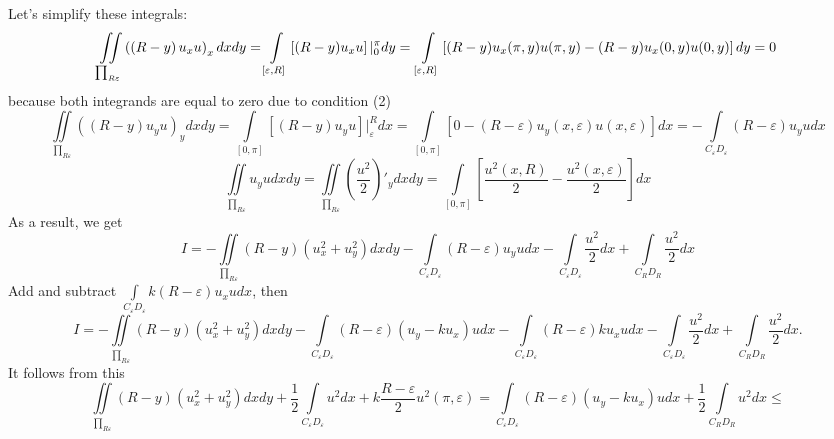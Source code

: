\documentclass[11pt,twoside]{article}
\begin{document}
	Let's simplify these integrals:
	\begin{equation*}
		\iint\limits_{\prod_{R\varepsilon}} \left( \left(R - y\right) u_x u\right)_x dx dy = \int\limits_{[\varepsilon, R]} \left[(R-y)u_xu\right] \vert_0^\pi dy = \\ \int\limits_{[\varepsilon, R]} \left[(R-y) u_x(\pi, y)u(\pi,y) - (R-y) u_x(0, y)u(0,y)\right]dy = 0
	\end{equation*} because both integrands are equal to zero due to condition (2)
	\begin{equation*}
		\iint\limits_{\prod_{R\varepsilon}} \left( \left(R - y\right) u_y u\right)_y dx dy = \int\limits_{[0,\pi]} \left[\left(R - y\right) u_y u\right] \vert_\varepsilon^R dx =
		\int\limits_{[0,\pi]} \left[0 - \left(R - \varepsilon \right) u_y(x, \varepsilon) u(x, \varepsilon) \right] dx =  - \int\limits_{C_\varepsilon D_\varepsilon} \left(R - \varepsilon \right) u_yu dx
	\end{equation*}
	\begin{equation*}
		\iint\limits_{\prod_{R\varepsilon}} u_y u dx dy = \iint\limits_{\prod_{R\varepsilon}} \left(\dfrac{u^2}{2}\right)'_ydx dy = \int\limits_{[0,\pi]} \left[\dfrac{u^2(x,R)}{2} - \dfrac{u^2(x, \varepsilon)}{2}\right] dx 
	\end{equation*}
	As a result, we get 
	\begin{equation*}
		I = - \iint\limits_{\prod_{R\varepsilon}} \left(R - y\right) \left(u_x^2 + u_y^2\right) dx dy
		- \int\limits_{C_\varepsilon D_\varepsilon} \left(R - \varepsilon\right) u_y u dx 
		-\int\limits_{C_\varepsilon D_\varepsilon} \dfrac{u^2}{2} dx + \int\limits_{C_R D_R} \dfrac{u^2}{2} dx 
	\end{equation*}
	Add and subtract $\int\limits_{C_\varepsilon D_\varepsilon} k\left(R - \varepsilon\right) u_x u dx$, then
	\begin{equation*}
		I = - \iint\limits_{\prod_{R\varepsilon}} \left(R - y\right) \left(u_x^2 + u_y^2\right) dx dy - 
		\int\limits_{C_\varepsilon D_\varepsilon} \left(R - \varepsilon \right) \left(u_y - ku_x\right)u dx - \int\limits_{C_\varepsilon D_\varepsilon} \left(R - \varepsilon\right) k u_x u dx - \int\limits_{C_\varepsilon D_\varepsilon}\dfrac{u^2}{2} dx + \int\limits_{C_R D_R} \dfrac{u^2}{2}dx.
	\end{equation*}
	It follows from this
	\begin{equation*}
		\iint\limits_{\prod_{R\varepsilon}} \left(R - y\right) \left(u_x^2 + u_y^2\right) dx dy + \dfrac{1}{2}\int\limits_{C_\varepsilon D_\varepsilon} u^2 dx +k\dfrac{R - \varepsilon}{2}u^2(\pi, \varepsilon)  =\int\limits_{C_\varepsilon D_\varepsilon} \left(R - \varepsilon \right) \left(u_y - ku_x\right)u dx + \dfrac12  \int\limits_{C_R D_R} u^2 dx \leq 
	\end{equation*}
\end{document}
